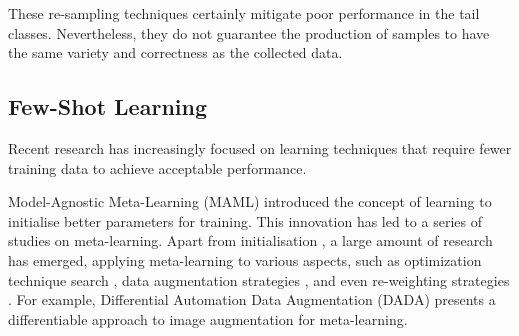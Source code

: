 
These re-sampling techniques certainly mitigate poor performance in the tail classes. Nevertheless, they do not guarantee the production of samples to have the same variety and correctness as the collected data.

\subsection{Few-Shot Learning}
Recent research has increasingly focused on learning techniques that require fewer training data to achieve acceptable performance.

Model-Agnostic Meta-Learning (MAML) \parencite{finn2017model} introduced the concept of learning to initialise better parameters for training. This innovation has led to a series of studies on meta-learning. Apart from initialisation \parencite{nichol2018first, 2018Reptile}, a large amount of research has emerged, applying meta-learning to various aspects, such as optimization technique search \parencite{andrychowicz2016learning}, data augmentation strategies \parencite{li2020dada, galashov2022data, cubuk2018autoaugment}, and even re-weighting strategies \parencite{shu2019meta}. For example, Differential Automation Data Augmentation (DADA) \parencite{li2020dada} presents a differentiable approach to image augmentation for meta-learning.


